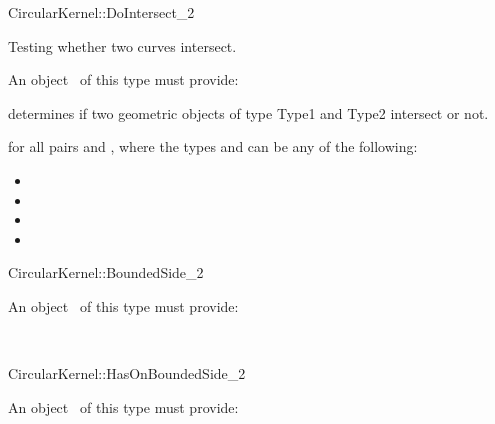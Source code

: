 \begin{ccRefFunctionObjectConcept}{CircularKernel::DoIntersect_2}

\ccDefinition

Testing whether two curves intersect.

\ccRefines



An object \ccVar\ of this type must provide:

{determines if two geometric objects of type Type1 and Type2 intersect or not.}

for all pairs  and , where the types 
 and  can be any of the following:
\begin{itemize}
\item {} 
\item {} 
\item {} 
\item {} 
\end{itemize} 

\end{ccRefFunctionObjectConcept}
\begin{ccRefFunctionObjectConcept}{CircularKernel::BoundedSide_2}

\ccRefines



An object \ccVar\ of this type must provide:

{}

\ccSeeAlso

\\

\end{ccRefFunctionObjectConcept}
\begin{ccRefFunctionObjectConcept}{CircularKernel::HasOnBoundedSide_2}

\ccRefines



An object \ccVar\ of this type must provide:

{}

\ccSeeAlso

\\

\end{ccRefFunctionObjectConcept}
